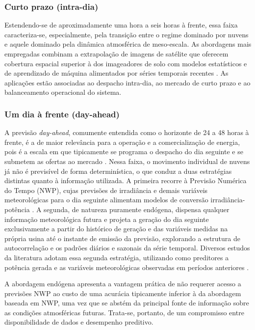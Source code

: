 \subsubsection*{Curto prazo (intra-dia)}

Estendendo-se de aproximadamente uma hora a seis horas à frente, essa faixa caracteriza-se, especialmente,
pela transição entre o regime dominado por nuvens e aquele dominado pela dinâmica
atmosférica de meso-escala. As abordagens mais empregadas combinam a extrapolação de
imagens de satélite que oferecem cobertura espacial superior à dos imageadores de solo
com modelos estatísticos e de aprendizado de máquina alimentados por séries temporais
recentes \cite{Tian2023}. As aplicações estão associadas ao despacho intra-dia, ao
mercado de curto prazo e ao balanceamento operacional do sistema.

\subsubsection*{Um dia à frente (day-ahead)}

A previsão \emph{day-ahead}, comumente entendida como o horizonte de 24 a 48 horas à
frente, é a de maior relevância para a operação e a comercialização de energia, pois é a
escala em que tipicamente se programa o despacho do dia seguinte e se submetem as ofertas
ao mercado \cite{Markovics2022}. Nessa faixa, o movimento individual de nuvens já não é
previsível de forma determinística, o que conduz a duas estratégias distintas quanto à
informação utilizada. A primeira recorre à Previsão Numérica do Tempo (NWP), cujas
previsões de irradiância e demais variáveis meteorológicas para o dia seguinte alimentam
modelos de conversão irradiância-potência \cite{Markovics2022}. A segunda, de natureza
puramente endógena, dispensa qualquer informação meteorológica futura e projeta a geração
do dia seguinte exclusivamente a partir do histórico de geração e das variáveis medidas na
própria usina até o instante de emissão da previsão, explorando a estrutura de
autocorrelação e os padrões diários e sazonais da série temporal. Diversos estudos da
literatura adotam essa segunda estratégia, utilizando como preditores a potência gerada e
as variáveis meteorológicas observadas em períodos anteriores \cite{Andrade2023}.

A abordagem endógena apresenta a vantagem prática de não requerer acesso a previsões NWP ao custo de uma acurácia tipicamente inferior à da abordagem
baseada em NWP, uma vez que se abstém da principal fonte de informação sobre as condições
atmosféricas futuras. Trata-se, portanto, de um compromisso entre disponibilidade de dados
e desempenho preditivo.

